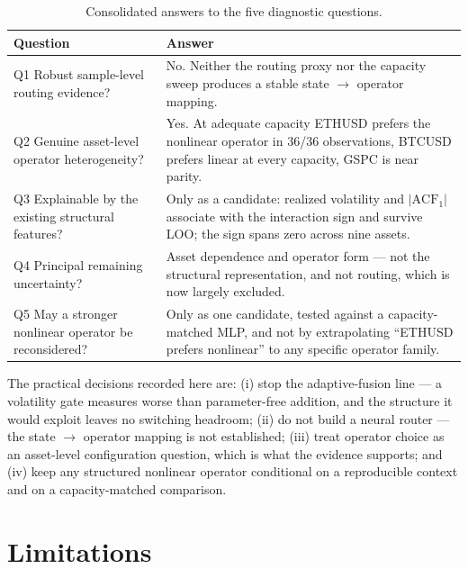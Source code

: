 \documentclass[preprint,12pt]{elsarticle}
\begin{document}
\begin{table}[!t]
\centering
\small
\caption{Consolidated answers to the five diagnostic questions.}
\label{tab:q}
\begin{tabular}{@{}p{}p{}@{}}
\toprule
Question & Answer \\
\midrule
Q1 Robust sample-level routing evidence? &
No. Neither the routing proxy nor the capacity sweep produces a stable
state $\rightarrow$ operator mapping. \\
Q2 Genuine asset-level operator heterogeneity? &
Yes. At adequate capacity ETHUSD prefers the nonlinear operator in 36/36
observations, BTCUSD prefers linear at every capacity, GSPC is near parity. \\
Q3 Explainable by the existing structural features? &
Only as a candidate: realized volatility and $|\mathrm{ACF}_1|$ associate with
the interaction sign and survive LOO; the sign spans zero across nine assets. \\
Q4 Principal remaining uncertainty? &
Asset dependence and operator form --- not the structural representation, and
not routing, which is now largely excluded. \\
Q5 May a stronger nonlinear operator be reconsidered? &
Only as one candidate, tested against a capacity-matched MLP, and not by
extrapolating ``ETHUSD prefers nonlinear'' to any specific operator family. \\
\bottomrule
\end{tabular}
\end{table}

The practical decisions recorded here are: (i) stop the adaptive-fusion line --- a volatility
gate measures worse than parameter-free addition, and the structure it would exploit leaves no
switching headroom; (ii) do not build a neural router --- the state $\rightarrow$ operator
mapping is not established; (iii) treat operator choice as an asset-level configuration
question, which is what the evidence supports; and (iv) keep any structured nonlinear operator
conditional on a reproducible context and on a capacity-matched comparison.

\section{Limitations}
\label{sec:limitations}
\end{document}
